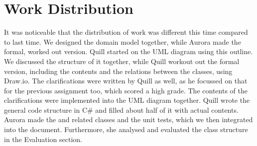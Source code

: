 \chapter{Work Distribution}
It was noticeable that the distribution of work was different this time compared to last time. We designed the domain model together, while Aurora made the formal, worked out version. Quill started on the UML diagram using this outline. We discussed the structure of it together, while Quill workout out the formal version, including the contents and the relations between the classes, using Draw.io. The clarifications were written by Quill as well, as he focussed on that for the previous assignment too, which scored a high grade. The contents of the clarifications were implemented into the UML diagram together. Quill wrote the general code structure in C\# and filled about half of it with actual contents. Aurora made the  and related classes and the unit tests, which we then integrated into the document. Furthermore, she analysed and evaluated the class structure in the Evaluation section. 